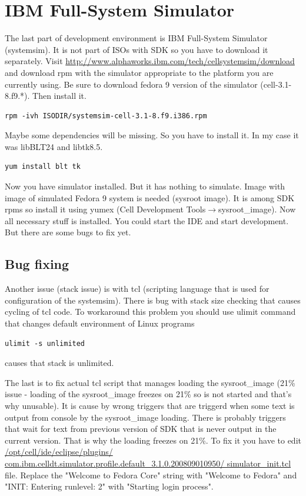 \section{IBM Full-System Simulator}

The last part of development environment is IBM Full-System Simulator (systemsim).
It is not part of ISOs with SDK so you have to download it separately.
Visit \url{http://www.alphaworks.ibm.com/tech/cellsystemsim/download} and download rpm with the simulator appropriate to the platform you are currently using.
Be sure to download fedora 9 version of the simulator (cell-3.1-8.f9.*). Then install it.

\begin{verbatim}
rpm -ivh ISODIR/systemsim-cell-3.1-8.f9.i386.rpm
\end{verbatim}

Maybe some dependencies will be missing. So you have to install it. In my case it was libBLT24 and libtk8.5.

\begin{verbatim}
yum install blt tk
\end{verbatim}

Now you have simulator installed. But it has nothing to simulate.
Image with image of simulated Fedora 9 system is needed (sysroot image).
It is among SDK rpms so install it using yumex (Cell Development Tools$\rightarrow$sysroot\_image).
Now all necessary stuff is installed.
You could start the IDE and start development. But there are some bugs to fix yet.

\subsection{Bug fixing}

\par
Another issue (stack issue) is with tcl (scripting language that is used for configuration of the systemsim).
There is bug with stack size checking that causes cycling of tcl code.
To workaround this problem you should use ulimit command that changes default environment of Linux programs

\begin{verbatim}
ulimit -s unlimited
\end{verbatim}

causes that stack is unlimited.

\par
The last is to fix actual tcl script that manages loading the sysroot\_image (21\% issue - loading of the sysroot\_image freezes on 21\% so is not started and that's why unusable).
It is cause by wrong triggers that are triggerd when some text is output from console by the sysroot\_image loading.
There is probably triggers that wait for text from previous version of SDK that is never output in the current version.
That is why the loading freezes on 21\%.
To fix it you have to edit \url{/opt/cell/ide/eclipse/plugins/ com.ibm.celldt.simulator.profile.default_3.1.0.200809010950/ simulator_init.tcl} file.
Replace the "Welcome to Fedora Core" string with "Welcome to Fedora" and "INIT: Entering runlevel: 2" with "Starting login process".

